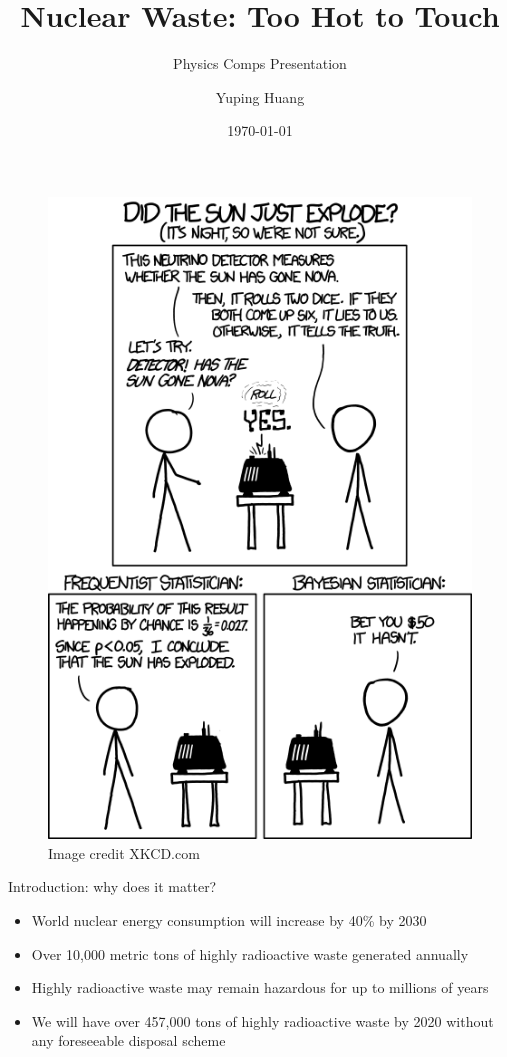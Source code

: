 \documentclass[10pt]{beamer}
\title{Nuclear Waste: Too Hot to Touch}
\subtitle{Physics Comps Presentation}
\date{\today}
\date{}
\author{Yuping Huang}
\institute{Department of Physics and Astronomy, Carleton College}
\begin{document}
\begin{frame}
\begin{figure}
\includegraphics[height=\textheight]{last}
\caption*{Image credit XKCD.com}
\end{figure}
\end{frame}
\maketitle
{}
\begin{frame}{Introduction: why does it matter?}
\begin{itemize}
	\item World nuclear energy consumption will increase by 40\% by 2030
    \item Over \alert{10,000} metric tons of highly radioactive waste generated annually
    \item Highly radioactive waste may remain hazardous for up to millions of years
    \item We will have over \alert{457,000} tons of highly radioactive waste by 2020 without any foreseeable disposal
    scheme
\end{itemize}
\end{frame}
\end{document}
